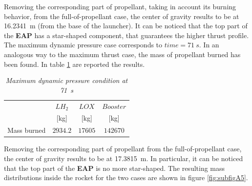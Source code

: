 \documentclass[12pt,fleqn,openany]{book} %
\begin{document}
\noindent Removing the corresponding part of propellant, taking in account its burning behavior, from the full-of-propellant case, the center of gravity results to be at \SI{16.2341}{m} (from the base of the launcher). It can be noticed that the top part of the \textbf{EAP} has a star-shaped component, that guarantees the higher thrust profile. The maximum dynamic pressure case corresponds to $time = \SI{71}{s}$. In an analogous way to the maximum thrust case, the mass of propellant burned has been found. In table \hypertarget{tab:maxP}{\ref{tab:maxP}} are reported the results.  

\begin{table}[h]
	\centering
	\begin{tabular}{ l c c c}
\toprule
										&$LH_2$ 			&$LOX$ 				&$Booster$	\\
										&[\si{\kilogram}]			&[\si{\kilogram}]			&[\si{\kilogram}]		\\
\midrule                                                                                                             
Mass burned								&$2934.2$			&$17605$			&$142670$			\\
\bottomrule
\end{tabular} 
\caption{\emph{Maximum dynamic pressure condition at \SI{71}{s}}}        
\label{tab:maxP}                       
\end{table} 
\noindent Removing the corresponding part of propellant from the full-of-propellant case, the center of gravity results to be at \SI{17.3815}{m}. In particular, it can be noticed that the top part of the \textbf{EAP} is no more star-shaped. The resulting mass distributions inside the rocket for the two cases are shown in figure \hypertarget{fig:subfigA5}{\ref{fig:subfigA5}}. 
\end{document}
